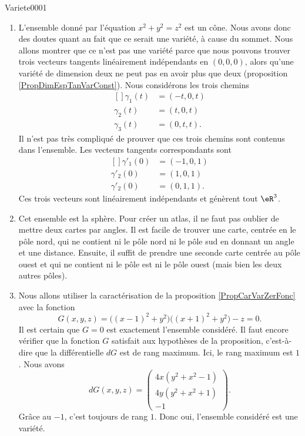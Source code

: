\begin{corrige}{Variete0001}
\begin{enumerate}
		\item
			L'ensemble donné par l'équation $x^2+y^2=z^2$ est un cône. Nous avons donc des doutes quant au fait que ce serait une variété, à cause du sommet.
			Nous allons montrer que ce n'est pas une variété parce que nous pouvons trouver trois vecteurs tangents linéairement indépendants en $(0,0,0)$, alors qu'une variété de dimension deux ne peut pas en avoir plus que deux (proposition \ref{PropDimEspTanVarConst}). Nous considérons les trois chemins
			\begin{equation}
				\begin{aligned}[]
					\gamma_1(t)&=(-t,0,t)\\
					\gamma_2(t)&=(t,0,t)\\
					\gamma_3(t)&=(0,t,t).
				\end{aligned}
			\end{equation}
			Il n'est pas très compliqué de prouver que ces trois chemins sont contenus dans l'ensemble. Les vecteurs tangents correspondants sont
			\begin{equation}
				\begin{aligned}[]
					\gamma'_1(0)&=(-1,0,1)\\
					\gamma'_2(0)&=(1,0,1)\\
					\gamma'_2(0)&=(0,1,1).
				\end{aligned}
			\end{equation}
			Ces trois vecteurs sont linéairement indépendants et génèrent tout $\eR^3$.

		\item
			Cet ensemble est la sphère. Pour créer un atlas, il ne faut pas oublier de mettre deux cartes par angles. Il est facile de trouver une carte, centrée en le pôle nord, qui ne contient ni le pôle nord ni le pôle sud en donnant un angle et une distance. Ensuite, il suffit de prendre une seconde carte centrée au pôle ouest et qui ne contient ni le pôle est ni le pôle ouest (mais bien les deux autres pôles).

		\item
			Nous allons utiliser la caractérisation de la proposition \ref{PropCarVarZerFonc} avec la fonction
			\begin{equation}
				G(x,y,z)=\big( (x-1)^2+y^2 \big)\big( (x+1)^2+y^2 \big)-z=0.
			\end{equation}
			Il est certain que $G=0$ est exactement l'ensemble considéré. Il faut encore vérifier que la fonction $G$ satisfait aux hypothèses de la proposition, c'est-à-dire que la différentielle $dG$ est de rang maximum. Ici, le rang maximum est $1$. Nous avons
			\begin{equation}
				dG(x,y,z)=
				\begin{pmatrix}
					4x(y^2+x^2-1)	\\ 
					4y(y^2+x^2+1)	\\ 
					-1	
				\end{pmatrix}.
			\end{equation}
			Grâce au $-1$, c'est toujours de rang $1$. Donc oui, l'ensemble considéré est une variété.


\end{enumerate}
\end{corrige}
